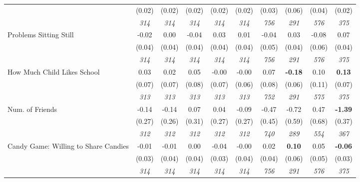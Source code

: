 \begin{tabular}{l c c c c c c c c c}
& (0.02) & (0.02) & (0.02) & (0.02) & (0.02) & (0.03) & (0.06) & (0.04) & (0.02) \\
& \textit{ 314 } & \textit{ 314 } & \textit{ 314 } & \textit{ 314 } & \textit{ 314 } & \textit{ 756 } & \textit{ 291 } & \textit{ 576 } & \textit{ 375 } \\
Problems Sitting Still & -0.02 & 0.00 & -0.04 & 0.03 & 0.01 & -0.04 & 0.03 & -0.08 & 0.07 \\
& (0.04) & (0.04) & (0.04) & (0.04) & (0.04) & (0.05) & (0.04) & (0.06) & (0.04) \\
& \textit{ 314 } & \textit{ 314 } & \textit{ 314 } & \textit{ 314 } & \textit{ 314 } & \textit{ 756 } & \textit{ 291 } & \textit{ 576 } & \textit{ 375 } \\
How Much Child Likes School & 0.03 & 0.02 & 0.05 & -0.00 & -0.00 & 0.07 & \textbf{-0.18} & 0.10 & \textbf{0.13} \\
& (0.07) & (0.07) & (0.08) & (0.07) & (0.06) & (0.08) & (0.06) & (0.11) & (0.07) \\
& \textit{ 313 } & \textit{ 313 } & \textit{ 313 } & \textit{ 313 } & \textit{ 313 } & \textit{ 752 } & \textit{ 291 } & \textit{ 575 } & \textit{ 375 } \\
Num. of Friends & -0.14 & -0.14 & 0.07 & 0.04 & -0.09 & -0.47 & -0.72 & 0.47 & \textbf{-1.39} \\
& (0.27) & (0.26) & (0.31) & (0.27) & (0.27) & (0.45) & (0.59) & (0.68) & (0.37) \\
& \textit{ 312 } & \textit{ 312 } & \textit{ 312 } & \textit{ 312 } & \textit{ 312 } & \textit{ 740 } & \textit{ 289 } & \textit{ 554 } & \textit{ 367 } \\
Candy Game: Willing to Share Candies & -0.01 & -0.01 & 0.00 & -0.04 & -0.00 & 0.02 & \textbf{0.10} & 0.05 & \textbf{-0.06} \\
& (0.03) & (0.04) & (0.04) & (0.03) & (0.04) & (0.04) & (0.06) & (0.05) & (0.03) \\
& \textit{ 314 } & \textit{ 314 } & \textit{ 314 } & \textit{ 314 } & \textit{ 314 } & \textit{ 756 } & \textit{ 291 } & \textit{ 576 } & \textit{ 375 } \\
\bottomrule
\end{tabular}
